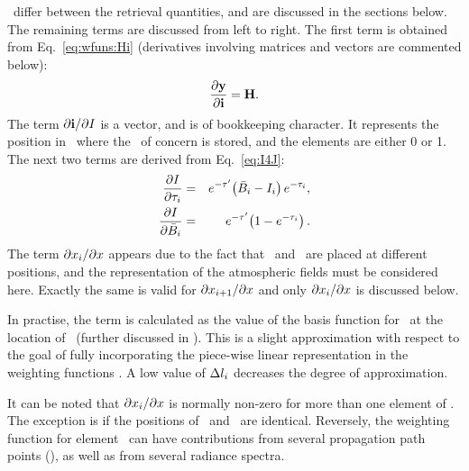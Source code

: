 \ differ between the retrieval quantities, and are discussed in
the sections below. The remaining terms are discussed from left to right.
The first term is obtained from Eq.~\ref{eq:wfuns:Hi} (derivatives involving
matrices and vectors are commented below):
\begin{equation}
  \frac{\partial\mathbf{y}}{\partial\mathbf{i}} = \mathbf{H}.
\end{equation}
The term $\partial\mathbf{i} / \partial I$ is a vector, and is of bookkeeping
character. It represents the position in \MpiVct\ where the \StoI\ of concern
is stored, and the elements are either 0 or 1.
The next two terms are derived from Eq.~\ref{eq:I4J}:
\begin{eqnarray}
  \frac{\partial I}{\partial\tau_{i}} 
      &=& e^{-\tau'}\!\left(\bar{B}_i-I_{i}\right)e^{-\tau_{i}}, \\
   \frac{\partial I}{\partial \bar{B}_i} &=&
   e^{-\tau'}\!\left(1-e^{-\tau_{i}}\right).
\end{eqnarray}
The term $\partial x_{i}/\partial x$ appears due to the fact that
\ and \SttElm\ are placed at different positions, and the
representation of the atmospheric fields must be considered here. Exactly the
same is valid for $\partial x_{i+1}/\partial x$ and only
$\partial x_{i}/\partial x$ is discussed below.

In practise, the term is calculated as the value of the basis function for
\SttElm\ at the location of \ (further discussed in
\citet{buehler:artst:05}). This is a slight approximation with respect to the
goal of fully incorporating the piece-wise linear representation in the
weighting functions \citep{buehler:artst:05}. A low value of
$\Delta l_{i}$ decreases the degree of approximation.

It can be noted that $\partial x_{i} / \partial x$ is normally non-zero
for more than one element of \SttVct. The exception is if the positions of
\ and \SttElm\ are identical. Reversely, the weighting function for
element \SttElm\ can have contributions from several propagation path points
(), as well as from several radiance spectra. 

